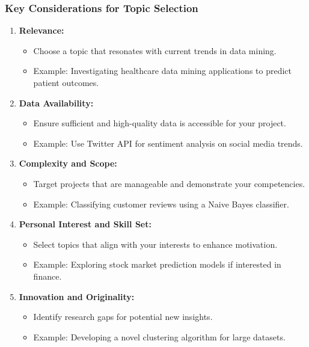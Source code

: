 \documentclass[aspectratio=169]{beamer}
\begin{document}
\begin{frame}[fragile]
  \frametitle{Key Considerations for Topic Selection}

  \begin{enumerate}
    \item \textbf{Relevance:}
      \begin{itemize}
        \item Choose a topic that resonates with current trends in data mining. 
        \item Example: Investigating healthcare data mining applications to predict patient outcomes.
      \end{itemize}
    
    \item \textbf{Data Availability:}
      \begin{itemize}
        \item Ensure sufficient and high-quality data is accessible for your project.
        \item Example: Use Twitter API for sentiment analysis on social media trends.
      \end{itemize}

    \item \textbf{Complexity and Scope:}
      \begin{itemize}
        \item Target projects that are manageable and demonstrate your competencies.
        \item Example: Classifying customer reviews using a Naive Bayes classifier.
      \end{itemize}

    \item \textbf{Personal Interest and Skill Set:}
      \begin{itemize}
        \item Select topics that align with your interests to enhance motivation.
        \item Example: Exploring stock market prediction models if interested in finance.
      \end{itemize}

    \item \textbf{Innovation and Originality:}
      \begin{itemize}
        \item Identify research gaps for potential new insights.
        \item Example: Developing a novel clustering algorithm for large datasets.
      \end{itemize}
  \end{enumerate}
\end{frame}
\end{document}
